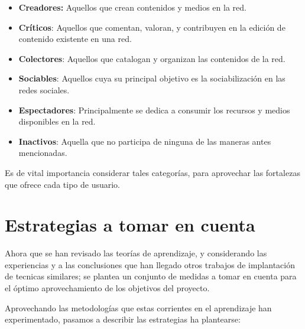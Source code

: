 \begin{itemize}
\item \textbf{Creadores:} Aquellos que crean contenidos y medios en la red.
\item \textbf{Críticos}: Aquellos que comentan, valoran, y contribuyen en la
      edición de contenido existente en una red.
\item \textbf{Colectores}: Aquellos que catalogan y organizan las contenidos de
      la red.
\item \textbf{Sociables}: Aquellos cuya su principal objetivo es la
      sociabilización en las redes sociales.
\item \textbf{Espectadores}: Principalmente se dedica a consumir los recursos y
      medios disponibles en la red.
\item \textbf{Inactivos}: Aquella que no participa de ninguna de las maneras
      antes mencionadas.
\end{itemize}

Es de vital importancia considerar tales categorías, para aprovechar las
fortalezas que ofrece cada tipo de usuario.

\section{Estrategias a tomar en cuenta}

Ahora que se han revisado las teorías de aprendizaje, y considerando las
experiencias y a las conclusiones que han llegado otros trabajos de implantación
de tecnicas similares\cite{Ontalba}; se plantea un conjunto de medidas a tomar
en cuenta para el óptimo aprovechamiento de los objetivos del proyecto.

Aprovechando las metodologías que estas corrientes en el aprendizaje han
experimentado, pasamos a describir las estrategias ha plantearse:


